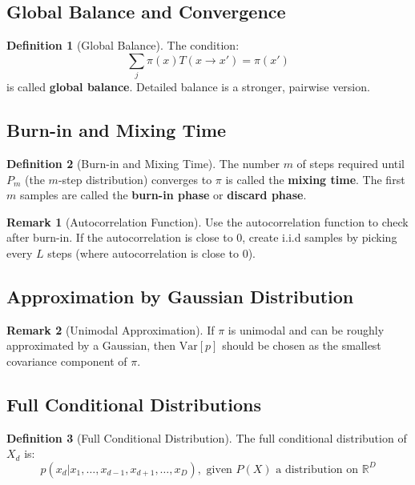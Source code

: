 \documentclass[12pt,a4paper]{article}
\theoremstyle{definition}
\newtheorem{definition}{Definition}[section]
\newtheorem{remark}{Remark}[section]
\begin{document}
\subsection{Global Balance and Convergence}

\begin{definition}[Global Balance]
The condition:
\[
\sum_j \pi(x) T(x \to x') = \pi(x')
\]
is called \textbf{global balance}. Detailed balance is a stronger, pairwise version.
\end{definition}

\subsection{Burn-in and Mixing Time}

\begin{definition}[Burn-in and Mixing Time]
The number $m$ of steps required until $P_m$ (the $m$-step distribution) converges to $\pi$ is called the \textbf{mixing time}. The first $m$ samples are called the \textbf{burn-in phase} or \textbf{discard phase}.
\end{definition}

\begin{remark}[Autocorrelation Function]
Use the autocorrelation function to check after burn-in. If the autocorrelation is close to 0, create i.i.d samples by picking every $L$ steps (where autocorrelation is close to 0).
\end{remark}

\subsection{Approximation by Gaussian Distribution}

\begin{remark}[Unimodal Approximation]
If $\pi$ is unimodal and can be roughly approximated by a Gaussian, then $\text{Var}[p]$ should be chosen as the smallest covariance component of $\pi$.
\end{remark}

\subsection{Full Conditional Distributions}

\begin{definition}[Full Conditional Distribution]
The full conditional distribution of $X_d$ is:
\[
p(x_d | x_1, \ldots, x_{d-1}, x_{d+1}, \ldots, x_D), \text{ given } P(X) \text{ a distribution on } \mathbb{R}^D
\]
\end{definition}
\end{document}
